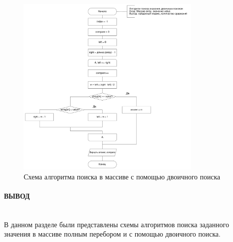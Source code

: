 \begin{figure}[h]
    \centering
    \includegraphics[width=0.8\textwidth]{images/2.png}
    \caption{Схема алгоритма поиска в массиве с помощью двоичного поиска}
    \label{fig:images-2}
\end{figure}

\clearpage

\paragraph*{ВЫВОД} ${}$ \\

В данном разделе были представлены схемы алгоритмов поиска заданного значения в массиве
полным перебором и с помощью двоичного поиска.


\clearpage
